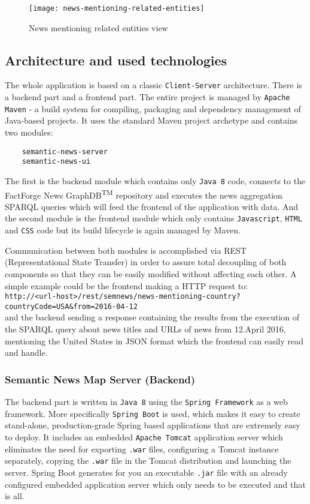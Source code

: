 \begin{figure}[h!]
    \centering
    \texttt{[image: news-mentioning-related-entities]}
    \caption{News mentioning related entities view}
    \label{fig:news-mentioning-related-entities}
\end{figure}

\subsection{Architecture and used technologies}
The whole application is based on a classic \verb|Client-Server| architecture. There is a backend part and a frontend part. The entire project is managed by \verb|Apache Maven| - a build system for compiling, packaging and dependency management of Java-based projects. It uses the standard Maven project archetype and contains two modules:
\begin{verbatim}
    semantic-news-server
    semantic-news-ui
\end{verbatim}
The first is the backend module which contains only \verb|Java 8| code, connects to the FactForge News GraphDB\textsuperscript{TM} repository and executes the news aggregation SPARQL queries which will feed the frontend of the application with data. And the second module is the frontend module which only contains \verb|Javascript|, \verb|HTML| and \verb|CSS| code but its build lifecycle is again managed by Maven.

Communication between both modules is accomplished via REST (Representational State Transfer) in order to assure total decoupling of both components so that they can be easily modified without affecting each other. A simple example could be the frontend making a HTTP request to:\\
\texttt{http://<url-host>/rest/semnews/news-mentioning-country?\\countryCode=USA\&from=2016-04-12}\\ and the backend sending a response containing the results from the execution of the SPARQL query about news titles and URLs of news from 12.April 2016, mentioning the United States in JSON format which the frontend can easily read and handle. 

\subsubsection{Semantic News Map Server (Backend)}
The backend part is written in \texttt{Java 8} using the \texttt{Spring Framework} as a web framework. More specifically \texttt{Spring Boot} is used, which makes it easy to create stand-alone, production-grade Spring based applications that are extremely easy to deploy. It includes an embedded \texttt{Apache Tomcat} application server which eliminates the need for exporting \texttt{.war} files, configuring a Tomcat instance separately, copying the \texttt{.war} file in the Tomcat distribution and launching the server. Spring Boot generates for you an executable \texttt{.jar} file with an already configured embedded application server which only needs to be executed and that is all.

